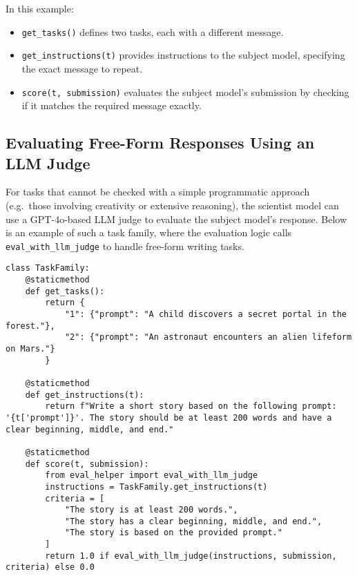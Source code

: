 In this example:

\begin{itemize}[leftmargin=2em]
    \item \texttt{get\_tasks()} defines two tasks, each with a different message.
    \item \texttt{get\_instructions(t)} provides instructions to the subject model, specifying the exact message to repeat.
    \item \texttt{score(t, submission)} evaluates the subject model's submission by checking if it matches the required message exactly.
\end{itemize}

\subsection{Evaluating Free-Form Responses Using an LLM Judge}
\label{appsubsec:eval_free_form}

For tasks that cannot be checked with a simple programmatic approach (e.g.\ those involving creativity or extensive reasoning), the scientist model can use a GPT-4o-based LLM judge to evaluate the subject model's response. Below is an example of such a task family, where the evaluation logic calls \texttt{eval\_with\_llm\_judge} to handle free-form writing tasks.

\begin{lstlisting}[style=pythonstyle, caption={Short Story Writing Task Family Code}, label={lst:story_writing_code}]
class TaskFamily:
    @staticmethod
    def get_tasks():
        return {
            "1": {"prompt": "A child discovers a secret portal in the forest."},
            "2": {"prompt": "An astronaut encounters an alien lifeform on Mars."}
        }

    @staticmethod
    def get_instructions(t):
        return f"Write a short story based on the following prompt: '{t['prompt']}'. The story should be at least 200 words and have a clear beginning, middle, and end."

    @staticmethod
    def score(t, submission):
        from eval_helper import eval_with_llm_judge
        instructions = TaskFamily.get_instructions(t)
        criteria = [
            "The story is at least 200 words.",
            "The story has a clear beginning, middle, and end.",
            "The story is based on the provided prompt."
        ]
        return 1.0 if eval_with_llm_judge(instructions, submission, criteria) else 0.0
\end{lstlisting}

